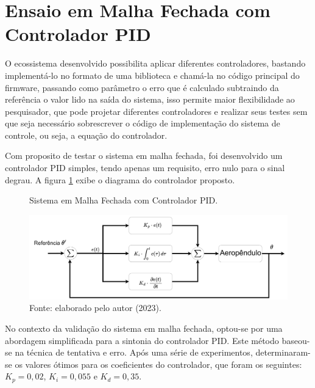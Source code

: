 \section{Ensaio em Malha Fechada com Controlador PID}
\label{malha_fechada}

O ecossistema desenvolvido possibilita aplicar diferentes controladores, bastando implementá-lo no formato de uma biblioteca e chamá-la no código principal do firmware, passando como parâmetro o erro que é calculado subtraindo da referência o valor lido na saída do sistema, isso permite maior flexibilidade ao pesquisador, que pode projetar diferentes controladores e realizar seus testes sem que seja necessário sobrescrever o código de implementação do sistema de controle, ou seja, a equação do controlador.

Com  proposito de testar o sistema em malha fechada, foi desenvolvido um controlador PID simples, tendo apenas um requisito, erro nulo para o sinal degrau. A figura \ref{fig3:image_23} exibe o diagrama do controlador proposto.%


\begin{figure}[!h]
	\centering
	\caption{Sistema em Malha Fechada com Controlador PID.}
	\includegraphics[width=1\textwidth]{Capitulos/3_1_resultados_discurcao/3_figuras/estrutura_pid.pdf}
	\caption*{Fonte: elaborado pelo autor (2023).}
	\label{fig3:image_23}
\end{figure}


No contexto da validação do sistema em malha fechada, optou-se por uma abordagem simplificada para a sintonia do controlador PID. Este método baseou-se na técnica de tentativa e erro. Após uma série de experimentos, determinaram-se os valores ótimos para os coeficientes do controlador, que foram os seguintes: $K_p=0,02$, $K_i=0,055$ e $K_d=0,35$.



